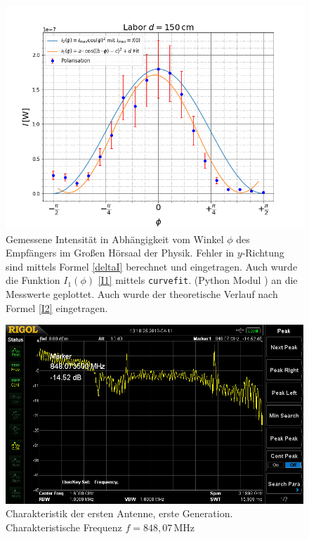 \documentclass[titlepage,11pt,a4paper,ngerman]{article}
\begin{document}
\begin{figure}
	\centering
	\includegraphics[scale=0.55]{Bilder/Polarisation-Labor}
	\caption{Gemessene Intensität in Abhängigkeit vom Winkel $\phi$ des Empfängers im Großen Hörsaal der Physik. Fehler in $y$-Richtung sind mittels Formel \eqref{deltaI} berechnet und eingetragen. Auch wurde die Funktion $I_{1}(\phi)$ \eqref{I1}  mittels \texttt{curvefit}. (Python Modul \cite{curvescipy}) an die Messwerte geplottet. Auch wurde der theoretische Verlauf nach Formel \eqref{I2} eingetragen.}
	\label{GrH-P}
\end{figure}

\begin{figure}[ht]
	\includegraphics[scale=0.075]{Bilder/ant32.jpg}
	\centering
	\caption{Charakteristik der ersten Antenne, erste Generation. Charakteristische Frequenz $f=848{,}07\,$MHz}
	\label{Ant1alt}
\end{figure}
\end{document}
